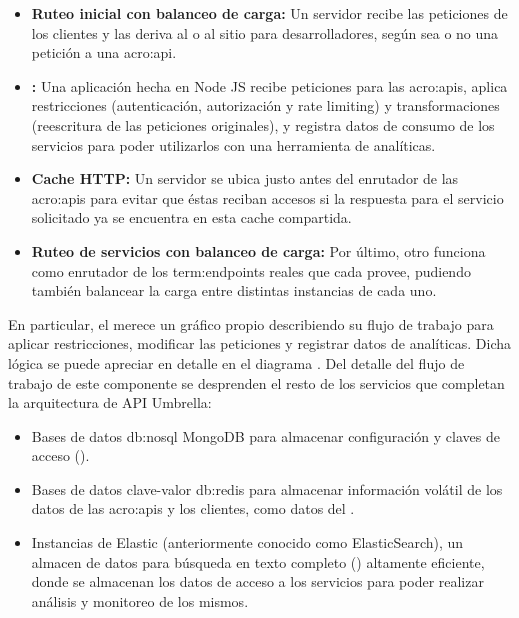 \begin{itemize}
  \item \textbf{Ruteo inicial con balanceo de carga:} Un servidor  recibe las peticiones de los clientes y las deriva al  o al sitio para desarrolladores, según sea o no una petición a una \gls{acro:api}.
  \item \textbf{:} Una aplicación hecha en Node JS recibe peticiones para las \glspl{acro:api}, aplica restricciones (autenticación, autorización y rate limiting) y transformaciones (reescritura de las peticiones originales), y registra datos de consumo de los servicios para poder utilizarlos con una herramienta de analíticas.
  \item \textbf{Cache HTTP:} Un servidor  se ubica justo antes del enrutador de las \glspl{acro:api} para evitar que éstas reciban accesos si la respuesta para el servicio solicitado ya se encuentra en esta cache compartida.
  \item \textbf{Ruteo de servicios con balanceo de carga:} Por último, otro  funciona como enrutador de los \glspl{term:endpoint} reales que cada  provee, pudiendo también balancear la carga entre distintas instancias de cada uno.
\end{itemize}

En particular, el  merece un gráfico propio describiendo su flujo de trabajo para aplicar restricciones, modificar las peticiones y registrar datos de analíticas. Dicha lógica se puede apreciar en detalle en el diagrama . Del detalle del flujo de trabajo de este componente se desprenden el resto de los servicios que completan la arquitectura de API Umbrella:

\begin{itemize}
  \item Bases de datos \gls{db:nosql} MongoDB para almacenar configuración y claves de acceso ().
  \item Bases de datos clave-valor \gls{db:redis} para almacenar información volátil de los datos de las \glspl{acro:api} y los clientes, como datos del .
  \item Instancias de Elastic (anteriormente conocido como ElasticSearch), un almacen de datos para búsqueda en texto completo () altamente eficiente, donde se almacenan los datos de acceso a los servicios para poder realizar análisis y monitoreo de los mismos.
\end{itemize}

